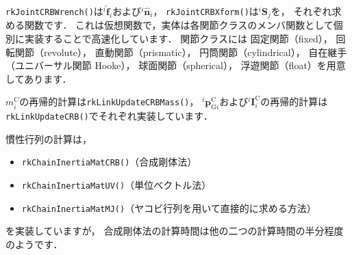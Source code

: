 \documentclass{jsarticle}
\begin{document}
\verb|rkJointCRBWrench()|は${}^{i}\hat{\bm{f}}_{i}$および${}^{i}\hat{\bm{n}}_{i}$，
\verb|rkJointCRBXform()|は${}^{i}\bm{S}_{j}$を，
それぞれ求める関数です．
これは仮想関数で，実体は各関節クラスのメンバ関数として個別に実装することで高速化しています．
関節クラスには
固定関節（fixed），
回転関節（revolute），
直動関節（prismatic），
円筒関節（cylindrical），
自在継手（ユニバーサル関節 Hooke），
球面関節（spherical），
浮遊関節（float）を用意してあります．

$m_{i}^{\mathrm{C}}$の再帰的計算は\verb|rkLinkUpdateCRBMass()|，
${}^{i}\bm{p}_{\mathrm{G}i}^{\mathrm{C}}$および${}^{i}\bm{I}_{i}^{\mathrm{C}}$の再帰的計算は
\verb|rkLinkUpdateCRB()|でそれぞれ実装しています．

慣性行列の計算は，
\begin{itemize}
\item \verb|rkChainInertiaMatCRB()|（合成剛体法）
\item \verb|rkChainInertiaMatUV()|（単位ベクトル法）
\item \verb|rkChainInertiaMatMJ()|（ヤコビ行列を用いて直接的に求める方法）
\end{itemize}
を実装していますが，
合成剛体法の計算時間は他の二つの計算時間の半分程度のようです．
\end{document}
